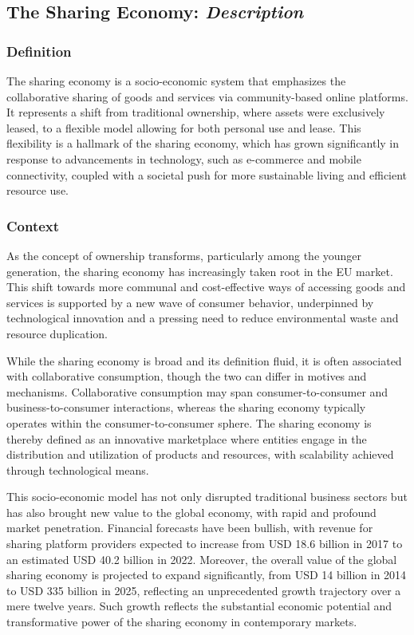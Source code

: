 \subsection{The Sharing Economy: \textit{Description}}\cite{dabbous2021sharing, pwc2016sharing, dggrow2018sharing, dggrow2018sharingenv, dabbous2021sharing, ps2share2017sharing, zhu2021sharing}

\subsubsection{Definition}
The sharing economy is a socio-economic system that emphasizes the
collaborative sharing of goods and services via community-based online
platforms. It represents a shift from traditional ownership, where assets were
exclusively leased, to a flexible model allowing for both personal use and
lease. This flexibility is a hallmark of the sharing economy, which has grown
significantly in response to advancements in technology, such as e-commerce and
mobile connectivity, coupled with a societal push for more sustainable living
and efficient resource use.




\subsubsection{Context}
As the concept of ownership transforms, particularly among the younger
generation, the sharing economy has increasingly taken root in the EU market.
This shift towards more communal and cost-effective ways of accessing goods and
services is supported by a new wave of consumer behavior, underpinned by
technological innovation and a pressing need to reduce environmental waste and
resource duplication.

While the sharing economy is broad and its definition fluid, it is often
associated with collaborative consumption, though the two can differ in motives
and mechanisms. Collaborative consumption may span consumer-to-consumer and
business-to-consumer interactions, whereas the sharing economy typically
operates within the consumer-to-consumer sphere. The sharing economy is thereby
defined as an innovative marketplace where entities engage in the distribution
and utilization of products and resources, with scalability achieved through
technological means.

This socio-economic model has not only disrupted traditional business sectors
but has also brought new value to the global economy, with rapid and profound
market penetration. Financial forecasts have been bullish, with revenue for
sharing platform providers expected to increase from USD 18.6 billion in 2017
to an estimated USD 40.2 billion in 2022. Moreover, the overall value of the
global sharing economy is projected to expand significantly, from USD 14
billion in 2014 to USD 335 billion in 2025, reflecting an unprecedented growth
trajectory over a mere twelve years\cite{zhu2021sharing}. Such growth reflects
the substantial economic potential and transformative power of the sharing
economy in contemporary markets.

